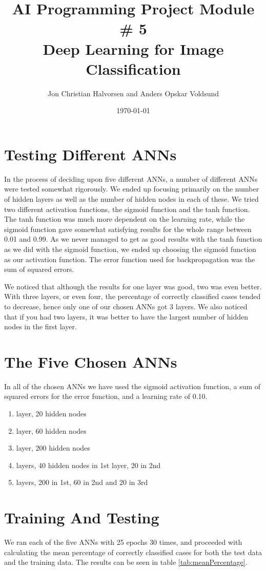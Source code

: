 \documentclass[11pt,a4paper]{article}
\author{Jon Christian Halvorsen and Anders Opskar Voldsund}
\title{ \textbf{ AI Programming Project Module \# 5 }  \\
Deep Learning for Image Classification }
\date{\today}
\begin{document}
\maketitle

\section{Testing Different ANNs}
In the process of deciding upon five different ANNs, a number of different ANNs were tested somewhat rigorously. We ended up focusing primarily on the number of hidden layers as well as the number of hidden nodes in each of these. We tried two different activation functions, the sigmoid function and the tanh function. The tanh function was much more dependent on the learning rate, while the sigmoid function gave somewhat satisfying results for the whole range between 0.01 and 0.99. As we never managed to get as good results with the tanh function as we did with the sigmoid function, we ended up choosing the sigmoid function as our activation function. The error function used for backpropagation was the sum of squared errors.

We noticed that although the results for one layer was good, two was even better. With three layers, or even four, the percentage of correctly classified cases tended to decrease, hence only one of our chosen ANNs got 3 layers. We also noticed that if you had two layers, it was better to have the largest number of hidden nodes in the first layer.

\section{The Five Chosen ANNs}
In all of the chosen ANNs we have used the sigmoid activation function, a sum of squared errors for the error function, and a learning rate of 0.10.
\begin{enumerate}
\item {} layer, 20 hidden nodes
\item {} layer, 60 hidden nodes
\item {} layer, 200 hidden nodes
\item {} layers, 40 hidden nodes in 1st layer, 20 in 2nd
\item {} layers, 200 in 1st, 60 in 2nd and 20 in 3rd
\end{enumerate}

\section{Training And Testing}
We ran each of the five ANNs with 25 epochs 30 times, and proceeded with calculating the mean percentage of correctly classified cases for both the test data and the training data. The results can be seen in table \ref{tab:meanPercentage}.
\end{document}
